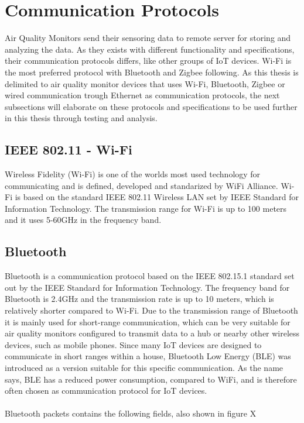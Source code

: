 \section*{Communication Protocols}
Air Quality Monitors send their sensoring data to remote server for storing and analyzing the data. As they exists with different functionality and specifications, their communication protocols differs, like other groups of IoT devices. \cite{AQMBigSource} Wi-Fi is the most preferred protocol with Bluetooth and Zigbee following. \cite{saini2020indoor} As this thesis is delimited to air quality monitor devices that uses Wi-Fi, Bluetooth, Zigbee or wired communication trough Ethernet as communication protocols, the next subsections will elaborate on these protocols and specifications to be used further in this thesis through testing and analysis. 

\subsection*{IEEE 802.11 - Wi-Fi}
Wireless Fidelity (Wi-Fi) \cite{WiFiAlliance} is one of the worlds most used technology for communicating and is defined, developed and standarized by WiFi Alliance. \cite{WiFiAlliance} Wi-Fi is based on the standard IEEE 802.11 Wireless LAN set by IEEE Standard for Information Technology. \cite{WifiStandard} The transmission range for Wi-Fi is up to 100 meters and it uses 5-60GHz in the frequency band. \cite{IAQMonitorCommunicationReview}

\subsection*{Bluetooth}
Bluetooth is a communication protocol based on the IEEE 802.15.1 standard set out by the IEEE Standard for Information Technology. The frequency band for Bluetooth is 2.4GHz and the transmission rate is up to 10 meters, which is relatively shorter compared to Wi-Fi. \cite{IAQMonitorCommunicationReview} Due to the transmission range of Bluetooth it is mainly used for short-range communication, which can be very suitable for air quality monitors configured to transmit data to a hub or nearby other wireless devices, such as mobile phones. Since many IoT devices are designed to communicate in short ranges within a house, Bluetooth Low Energy (BLE) was introduced as a version suitable for this specific communication. \cite{SecurityofCommunicationProt} As the name says, BLE has a reduced power consumption, compared to WiFi, and is therefore often chosen as communication protocol for IoT devices. 
\\\\
Bluetooth packets contains the following fields, also shown in figure X

